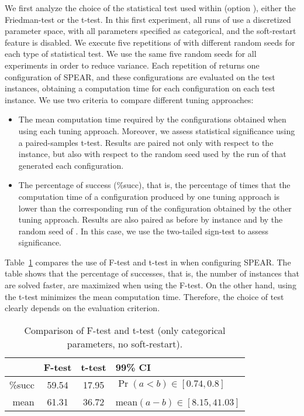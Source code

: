 We first analyze the choice of the statistical test used within \irace
(option ), either the Friedman-test or the
t-test. In this first experiment, all runs of \irace use a discretized
parameter space, with all parameters specified as categorical, and the
soft-restart feature is disabled. We execute five repetitions of
\irace with different random seeds for each type of statistical test.
We use the same five random seeds for all experiments in order to
reduce variance. Each repetition of \irace returns one configuration
of SPEAR, and these configurations are evaluated on the test
instances, obtaining a computation time for each configuration on each
test instance. We use two criteria to compare different tuning
approaches:
%
\begin{itemize}
\item The mean computation time required by the configurations
  obtained when using each tuning approach. Moreover, we assess statistical
  significance using a paired-samples t-test. Results are paired not only with
  respect to the instance, but also with respect to the random seed
  used by the run of \irace that generated each configuration.

\item The percentage of success (\%succ), that is, the percentage of
  times that the computation time of a configuration produced by one
  tuning approach is lower than the corresponding run of the
  configuration obtained by the other tuning approach. Results are
  also paired as before by instance and by the random seed of
  \irace. In this case, we use the two-tailed sign-test to assess
  significance.
\end{itemize}

Table~\ref{tab:testtype} compares the use of F-test and t-test in
\irace when configuring SPEAR. The table shows that the percentage of
successes, that is, the number of instances that are solved faster,
are maximized when using the F-test. On the other hand, using the
t-test minimizes the mean computation time. Therefore, the choice of
test clearly depends on the evaluation criterion.



\begin{table}[tp] 
  \centering \caption{Comparison of F-test and t-test (only categorical parameters, no soft-restart).}
  \label{tab:testtype}
  \begin{tabular}{rccl}
    \toprule
    & F-test & t-test  & 99\% CI\\\midrule
    \%succ & 59.54 & 17.95 & $\Pr(a < b) \in [0.74, 0.8]$\\
    mean   & 61.31 & 36.72 & mean$(a - b) \in [8.15, 41.03]$\\
    \bottomrule
  \end{tabular}
\end{table}


